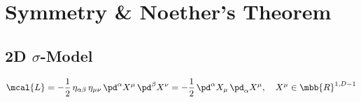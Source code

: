 \documentclass[a4paper,10pt]{article}
\begin{document}
\maketitle
\pagestyle{headings}
\thispagestyle{empty}

\vspace*{-1.5\baselineskip}

\section{Symmetry \& Noether's Theorem}
\subsection{2D $\sigma$-Model}
	\vspace{-.8\baselineskip}
	\begin{equation}
		\mcal{L} = -\frac{1}{2}\,
			\eta_{\alpha\beta}\,
			\eta_{\mu\nu}\,
			\pd^\alpha X^\mu\,
			\pd^\beta X^\nu
		= -\frac{1}{2}\,
			\pd^\alpha X_\mu\,
			\pd_\alpha X^\mu,\quad
		X^\mu\in\mbb{R}^{1,D-1}
	\end{equation}
\end{document}

